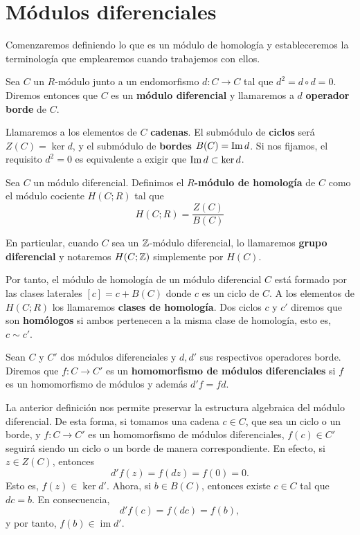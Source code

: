 \section{Módulos diferenciales}

Comenzaremos definiendo lo que es un módulo de homología y estableceremos la terminología
que emplearemos cuando trabajemos con ellos.

\begin{definicion}
	Sea \(C\) un \(R\)-módulo junto a un endomorfismo \(d: C \rightarrow C\) tal que \(d^{2}
	= d \circ d = 0\). Diremos entonces que \(C\) es un \textbf{módulo diferencial} y
	llamaremos a \(d\) \textbf{operador borde} de \(C\).
\end{definicion}

Llamaremos a los elementos de \(C\) \textbf{cadenas}. El submódulo de \textbf{ciclos}
será \(Z(C) = \ker d\), y el submódulo de \textbf{bordes} \(B(C) = \operatorname{Im} d\). Si nos
fijamos, el requisito \(d^{2}= 0\) es equivalente a exigir que \(\operatorname{Im}{d}\subset \ker{d}\).

\begin{definicion}
	Sea \(C\) un módulo diferencial. Definimos el \textbf{\(R\)-módulo de homología} de
	\(C\) como el módulo cociente \(H(C;R)\) tal que
	\[
	H(C;R) = \frac{Z(C)}{B(C)}
	\]
\end{definicion}

En particular, cuando \(C\) sea un \(\mathbb{Z}\)-módulo diferencial, lo llamaremos \textbf{grupo
	diferencial} y notaremos \(H(C;\mathbb{Z})\) simplemente por \(H(C)\).

Por tanto, el módulo de homología de un módulo diferencial \(C\) está formado por
las clases laterales \([c] = c + B(C)\) donde \(c\) es un ciclo de \(C\). A los elementos
de \(H(C;R)\) los llamaremos \textbf{clases de homología}. Dos ciclos \(c\) y \(c'\) diremos
que son \textbf{homólogos} si ambos pertenecen a la misma clase de homología, esto
es, \(c \sim c'\).

\begin{definicion}
	Sean \(C\) y \(C'\) dos módulos diferenciales y \(d, d'\) sus respectivos operadores
	borde. Diremos que \(f: C \rightarrow C'\) es un \textbf{homomorfismo de módulos
		diferenciales} si \(f\) es un homomorfismo de módulos y además \(d'f = fd\).
\end{definicion}

La anterior definición nos permite preservar la estructura algebraica del módulo
diferencial. De esta forma, si tomamos una cadena \(c \in C\), que sea un ciclo o
un borde, y \(f\colon C \to C'\) es un homomorfismo de módulos diferenciales,
\(f(c) \in C'\) seguirá siendo un ciclo o un borde de manera correspondiente. En efecto,
si \(z \in Z(C)\), entonces
\[
d'f(z) = f(dz) = f(0) = 0.
\]
Esto es, \(f(z) \in \ker d'\). Ahora, si \(b \in B(C)\), entonces existe \(c \in C\) tal
que \(dc = b\). En consecuencia,
\[
d'f(c) = f(dc) = f(b),
\]
y por tanto, \(f(b) \in \operatorname{im}d'\).


